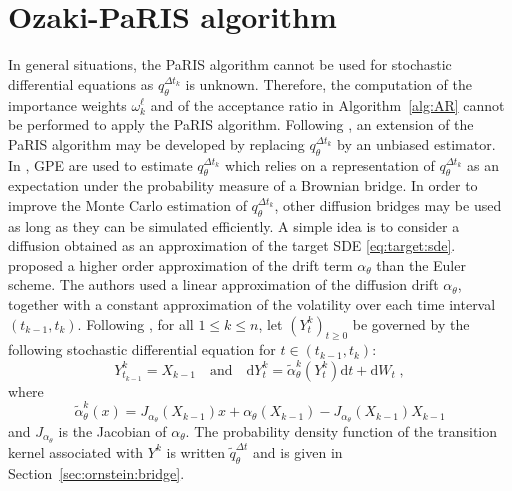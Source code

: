 \documentclass[12pt]{article}
\newcommand{\rmd}{\mathrm{d}}
\newcommand{\eqsp}{\;}
\newcommand{\1}{\mathrm{1}}
\begin{document}
\section{Ozaki-PaRIS algorithm}
\label{sec:PaRIS:SDE}
In general situations, the PaRIS algorithm cannot be used for stochastic differential equations as $q^{\Delta t_k}_{\theta}$ is unknown. Therefore, the computation of the importance weights $\omega_{k}^{\ell}$ and of the acceptance ratio in Algorithm~\ref{alg:AR} cannot be performed to apply the PaRIS algorithm. Following \cite{olsson:strojby:2011},
an extension of the PaRIS algorithm may be developed by replacing $q^{\Delta t_k}_{\theta}$  by an unbiased estimator. In \cite{olsson:strojby:2011},  GPE are used to estimate $q^{\Delta t_k}_{\theta}$ which relies on a representation of $q^{\Delta t_k}_{\theta}$ as an expectation under the probability measure of a Brownian bridge. 
In order to improve the Monte Carlo estimation of $q^{\Delta t_k}_{\theta}$,  other diffusion bridges may be used as long as they can be simulated efficiently. A simple idea is to consider a diffusion obtained as an approximation of the target SDE \eqref{eq:target:sde}. \cite{ozaki:1992,shoji:ozaki:1998} proposed a higher order approximation of the drift term $\alpha_{\theta}$ than the Euler scheme. The authors used a linear approximation of the diffusion drift $\alpha_{\theta}$, together with a constant approximation of the volatility over each time interval $(t_{k-1},t_k)$. Following \cite{ozaki:1992,shoji:ozaki:1998}, for all $1\le k\le n$, let $(Y^{k}_t)_{t\ge 0}$ be governed by the following stochastic differential equation for $t\in(t_{k-1},t_k)$:
\begin{equation}
\label{eq:SDE:Ozaki}
Y^k_{t_{k-1}} = X_{k-1}\quad\mbox{and}\quad\rmd Y^k_t = \widetilde{\alpha}^k_{\theta}(Y^k_t)\rmd t + \rmd W_t\eqsp,
\end{equation}
where
\[
\widetilde{\alpha}^k_{\theta}(x) = J_{\alpha_{\theta}}(X_{k-1})x + \alpha_{\theta}(X_{k-1}) - J_{\alpha_{\theta}}(X_{k-1})X_{k-1}
\]
and $J_{\alpha_{\theta}}$ is the Jacobian of $\alpha_{\theta}$. The probability density function of the transition kernel associated with $Y^k$ is written $\widetilde{q}^{\Delta t}_{\theta}$ and is given in Section~\ref{sec:ornstein:bridge}.
\end{document}
